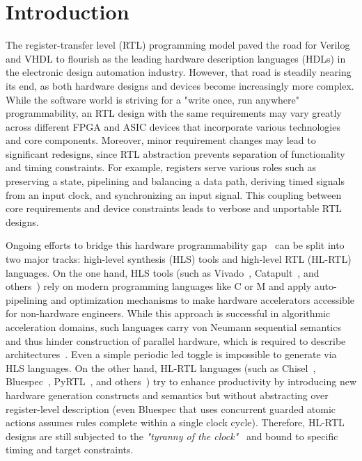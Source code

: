 \section{Introduction}
The register-transfer level (RTL) programming model paved the road for Verilog and VHDL to flourish as the leading hardware description languages (HDLs) in the electronic design automation industry. However, that road is steadily nearing its end, as both hardware designs and devices become increasingly more complex. While the software world is striving for a "write once, run anywhere" programmability, an RTL design with the same requirements may vary greatly across different FPGA and ASIC devices that incorporate various technologies and core components. Moreover, minor requirement changes may lead to significant redesigns, since RTL abstraction prevents separation of functionality and timing constraints. For example, registers serve various roles such as preserving a state, pipelining and balancing a data path, deriving timed signals from an input clock, and synchronizing an input signal. This coupling between core requirements and device constraints leads to verbose and unportable RTL designs. 

Ongoing efforts to bridge this hardware programmability gap~\cite{Kapre2016, Nane2016, Windh2015} can be split into two major tracks: high-level synthesis (HLS) tools and high-level RTL (HL-RTL) languages.
On the one hand, HLS tools (such as Vivado~\cite{Vivado2012}, Catapult~\cite{graphics2008catapult}, and others~\cite{Kavvadias2013, synphony2015}) rely on modern programming languages like C or M and apply auto-pipelining and optimization mechanisms to make hardware accelerators accessible for non-hardware engineers. While this approach is successful in algorithmic acceleration domains, such languages carry von Neumann sequential semantics and thus hinder construction of parallel hardware, which is required to describe architectures~\cite{Zhao2017}. Even a simple periodic led toggle is impossible to generate via HLS languages.
On the other hand, HL-RTL languages (such as Chisel~\cite{Bachrach2012}, Bluespec~\cite{nikhil2004bluespec}, PyRTL~\cite{Clow2017}, and others~\cite{Charles2016, Liu2017, jiang2018mamba, decaluwe2004myhdl, CxLang2014, Lockhart2014}) try to enhance productivity by introducing new hardware generation constructs and semantics but without abstracting over register-level description (even Bluespec that uses concurrent guarded atomic actions assumes rules complete within a single clock cycle). Therefore, HL-RTL designs are still subjected to the \emph{"tyranny of the clock"}~\cite{Sutherland2012} and bound to specific timing and target constraints.

